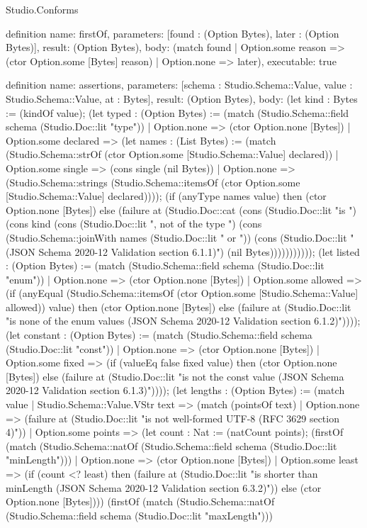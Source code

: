 \begin{lexlean}{Studio.Conforms}
\begin{semanticmodule}
definition{
  name: firstOf,
  parameters: [found : (Option Bytes), later : (Option Bytes)],
  result: (Option Bytes),
  body: (match found
    | Option.some reason => (ctor Option.some [Bytes] reason)
    | Option.none => later),
  executable: true
}

definition{
  name: assertions,
  parameters: [schema : Studio.Schema::Value, value : Studio.Schema::Value, at : Bytes],
  result: (Option Bytes),
  body: (let kind : Bytes := (kindOf value); (let typed : (Option Bytes) := (match (Studio.Schema::field schema (Studio.Doc::lit "type"))
    | Option.none => (ctor Option.none [Bytes])
    | Option.some declared => (let names : (List Bytes) := (match (Studio.Schema::strOf (ctor Option.some [Studio.Schema::Value] declared))
      | Option.some single => (cons single (nil Bytes))
      | Option.none => (Studio.Schema::strings (Studio.Schema::itemsOf (ctor Option.some [Studio.Schema::Value] declared)))); (if (anyType names value) then (ctor Option.none [Bytes]) else (failure at (Studio.Doc::cat (cons (Studio.Doc::lit "is ") (cons kind (cons (Studio.Doc::lit ", not of the type ") (cons (Studio.Schema::joinWith names (Studio.Doc::lit " or ")) (cons (Studio.Doc::lit " (JSON Schema 2020-12 Validation section 6.1.1)") (nil Bytes))))))))))); (let listed : (Option Bytes) := (match (Studio.Schema::field schema (Studio.Doc::lit "enum"))
    | Option.none => (ctor Option.none [Bytes])
    | Option.some allowed => (if (anyEqual (Studio.Schema::itemsOf (ctor Option.some [Studio.Schema::Value] allowed)) value) then (ctor Option.none [Bytes]) else (failure at (Studio.Doc::lit "is none of the enum values (JSON Schema 2020-12 Validation section 6.1.2)")))); (let constant : (Option Bytes) := (match (Studio.Schema::field schema (Studio.Doc::lit "const"))
    | Option.none => (ctor Option.none [Bytes])
    | Option.some fixed => (if (valueEq false fixed value) then (ctor Option.none [Bytes]) else (failure at (Studio.Doc::lit "is not the const value (JSON Schema 2020-12 Validation section 6.1.3)")))); (let lengths : (Option Bytes) := (match value
    | Studio.Schema::Value.VStr text => (match (pointsOf text)
      | Option.none => (failure at (Studio.Doc::lit "is not well-formed UTF-8 (RFC 3629 section 4)"))
      | Option.some points => (let count : Nat := (natCount points); (firstOf (match (Studio.Schema::natOf (Studio.Schema::field schema (Studio.Doc::lit "minLength")))
        | Option.none => (ctor Option.none [Bytes])
        | Option.some least => (if (count <? least) then (failure at (Studio.Doc::lit "is shorter than minLength (JSON Schema 2020-12 Validation section 6.3.2)")) else (ctor Option.none [Bytes]))) (firstOf (match (Studio.Schema::natOf (Studio.Schema::field schema (Studio.Doc::lit "maxLength")))
}
\end{semanticmodule}
\end{lexlean}
